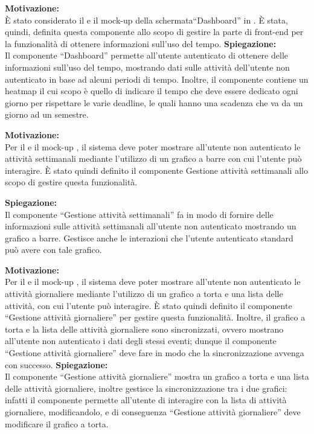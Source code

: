 \begin{listaPersonale}[ACI]{}

    \textbf{Motivazione:}\\
    È stato considerato il  e il mock-up della schermata“Dashboard” in . È stata, quindi, definita questa componente allo scopo di gestire la parte di front-end per la funzionalità di ottenere informazioni sull'uso del tempo.
    \textbf{Spiegazione:}\\
    Il componente “Dashboard” permette all'utente autenticato di ottenere delle informazioni sull'uso del tempo,  mostrando dati sulle attività dell'utente non autenticato in base ad alcuni periodi di tempo. Inoltre, il componente contiene un heatmap  il cui scopo è quello di indicare il tempo che deve essere dedicato ogni giorno per rispettare le varie deadline, le quali hanno una scadenza che va da un giorno ad un semestre.



    \textbf{Motivazione:}\\
    Per il  e il mock-up , il sistema deve poter mostrare all'utente non autenticato le attività settimanali mediante l'utilizzo di un grafico a barre con cui l'utente può interagire. È stato quindi definito il componente Gestione attività settimanali allo scopo di gestire questa funzionalità.

    \textbf{Spiegazione:}\\
    Il componente “Gestione attività settimanali” fa in modo di fornire delle informazioni sulle attività settimanali all'utente non autenticato mostrando un grafico a barre. Gestisce anche le interazioni che l'utente autenticato standard può avere con tale grafico.



    \textbf{Motivazione:}\\
    Per il  e il mock-up , il sistema deve poter mostrare all'utente non autenticato le attività giornaliere mediante l'utilizzo di un grafico a torta e una lista delle attività, con cui l'utente può interagire. È stato quindi definito il componente “Gestione attività giornaliere” per gestire questa funzionalità. Inoltre, il grafico a torta e la lista delle attività giornaliere sono sincronizzati, ovvero mostrano all'utente non autenticato i dati degli stessi eventi; dunque il componente “Gestione attività giornaliere” deve fare in modo che la sincronizzazione avvenga con successo.
    \textbf{Spiegazione:}\\
    Il componente “Gestione attività giornaliere” mostra un grafico a torta e una lista delle attività giornaliere, inoltre gestisce la sincronizzazione tra i due grafici: infatti il componente permette all'utente di interagire con la lista di attività giornaliere, modificandolo, e di conseguenza “Gestione attività giornaliere” deve modificare il grafico a torta.



\end{listaPersonale}
